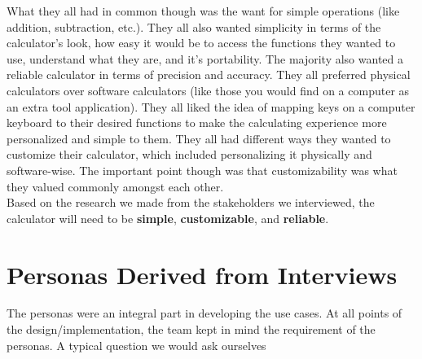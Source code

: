 \documentclass[a4paper, 12pt]{article}
\begin{document}
What they all had in common though was the want for simple operations (like addition, subtraction, etc.). They all also wanted simplicity in terms of the calculator's look, how easy it would be to access the functions they wanted to use, understand what they are, and it’s portability. The majority also wanted a reliable calculator in terms of precision and accuracy. They all preferred physical calculators over software calculators (like those you would find on a computer as an extra tool application). They all liked the idea of mapping keys on a computer keyboard to their desired functions to make the calculating experience more personalized and simple to them. They all had different ways they wanted to customize their calculator, which included personalizing it physically and software-wise. The important point though was that customizability was what they valued commonly amongst each other. \\

Based on the research we made from the stakeholders we interviewed, the calculator will need to be \textbf{simple}, \textbf{customizable}, and \textbf{reliable}.

\pagebreak

\section{Personas Derived from Interviews}

The personas were an integral part in developing the use cases. At all points of the design/implementation, the team kept in mind the requirement of the personas. A typical question we would ask ourselves 

\vspace{0.25in}
\end{document}

